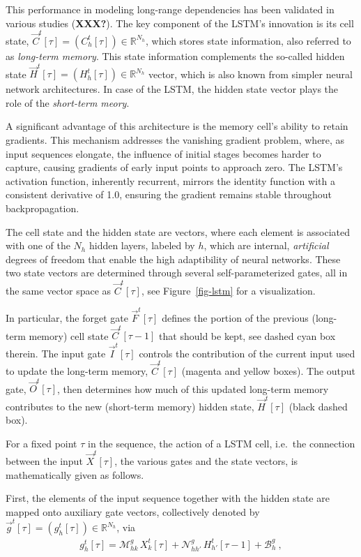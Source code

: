 \documentclass[
]{agujournal2019}
\begin{document}
This performance in modeling long-range dependencies has been validated
in various studies (\textbf{XXX?}). The key component of the LSTM's
innovation is its cell state,
\(\vec{C}^t[\tau] = (C^t_h[\tau]) \in \mathbb{R}^{N_h}\), which stores
state information, also referred to as \emph{long-term memory}. This
state information complements the so-called hidden state
\(\vec{H}^t[\tau] = (H^t_h[\tau]) \in \mathbb{R}^{N_h}\) vector, which
is also known from simpler neural network architectures. In case of the
LSTM, the hidden state vector plays the role of the \emph{short-term
meory}.

A significant advantage of this architecture is the memory cell's
ability to retain gradients. This mechanism addresses the vanishing
gradient problem, where, as input sequences elongate, the influence of
initial stages becomes harder to capture, causing gradients of early
input points to approach zero. The LSTM's activation function,
inherently recurrent, mirrors the identity function with a consistent
derivative of 1.0, ensuring the gradient remains stable throughout
backpropagation.

The cell state and the hidden state are vectors, where each element is
associated with one of the \(N_h\) hidden layers, labeled by \(h\),
which are internal, \emph{artificial} degrees of freedom that enable the
high adaptibility of neural networks. These two state vectors are
determined through several self-parameterized gates, all in the same
vector space as \(\vec{C}^t[\tau]\), see Figure~\ref{fig-lstm} for a
visualization.

In particular, the forget gate \(\vec{F}^t[\tau]\) defines the portion
of the previous (long-term memory) cell state \(\vec{C}^t[\tau-1]\) that
should be kept, see dashed cyan box therein\hspace{0pt}. The input gate
\(\vec{I}^t[\tau]\) controls the contribution of the current input used
to update the long-term memory, \(\vec{C}^t[\tau]\) (magenta and yellow
boxes). The output gate, \(\vec{O}^t[\tau]\), then determines how much
of this updated long-term memory contributes to the new (short-term
memory) hidden state, \(\vec{H}^t[\tau]\) (black dashed box).

For a fixed point \(\tau\) in the sequence, the action of a LSTM cell,
i.e.~the connection between the input \(\vec{X}^t[\tau]\), the various
gates and the state vectors, is mathematically given as follows.

First, the elements of the input sequence together with the hidden state
are mapped onto auxiliary gate vectors, collectively denoted by
\(\vec{g}^t[\tau] = (g^t_h[\tau]) \in \mathbb{R}^{N_h}\), via \[
\begin{aligned}
g_h^t[\tau] =  \mathcal{M}^{g}_{hk} \, X^t_k[\tau] +  \mathcal{N}^{g}_{hh'} \, H^t_{h'}[\tau-1] + \mathcal{B}^g_{h} \ ,
\end{aligned}
\]
\end{document}
